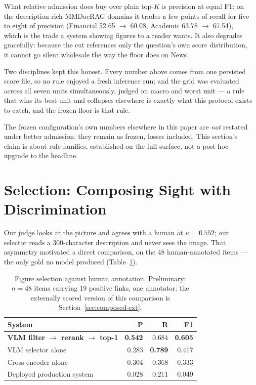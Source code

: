 \documentclass[journal]{IEEEtran}
\begin{document}
What relative admission does buy over plain top-$K$ is precision at equal F1:
on the description-rich MMDocRAG domains it trades a few points of recall for
five to eight of precision (Financial 52.65 $\to$ 60.08, Academic 63.78 $\to$
67.54), which is the trade a system showing figures to a reader wants. It also
degrades gracefully: because the cut references only the question's own score
distribution, it cannot go silent wholesale the way the floor does on News.

Two disciplines kept this honest. Every number above comes from one persisted
score file, so no rule enjoyed a fresh inference run; and the grid was
evaluated across all seven units simultaneously, judged on macro and worst
unit --- a rule that wins its best unit and collapses elsewhere is exactly
what this protocol exists to catch, and the frozen floor is that rule.

The frozen configuration's own numbers elsewhere in this paper are
\emph{not} restated under better admission: they remain as frozen, losses
included. This section's claim is about rule families, established on the full
surface, not a post-hoc upgrade to the headline.

\section{Selection: Composing Sight with Discrimination}
\label{sec:select}

Our judge looks at the picture and agrees with a human at $\kappa = 0.552$; our
selector reads a 300-character description and never sees the image. That
asymmetry motivated a direct comparison, on the 48 human-annotated items ---
the only gold no model produced (Table~\ref{tab:select}).

\begin{table}[t]
\caption{Figure selection against human annotation. Preliminary: $n = 48$ items
carrying 19 positive links, one annotator; the externally scored version of this
comparison is Section~\ref{sec:composed-ext}.}
\label{tab:select}
\centering
\begin{tabular}{@{}lrrr@{}}
\toprule
System & P & R & F1 \\
\midrule
\textbf{VLM filter $\to$ rerank $\to$ top-1} & \textbf{0.542} & 0.684 & \textbf{0.605} \\
VLM selector alone & 0.283 & \textbf{0.789} & 0.417 \\
Cross-encoder alone & 0.304 & 0.368 & 0.333 \\
Deployed production system & 0.028 & 0.211 & 0.049 \\
\bottomrule
\end{tabular}
\end{table}
\end{document}
